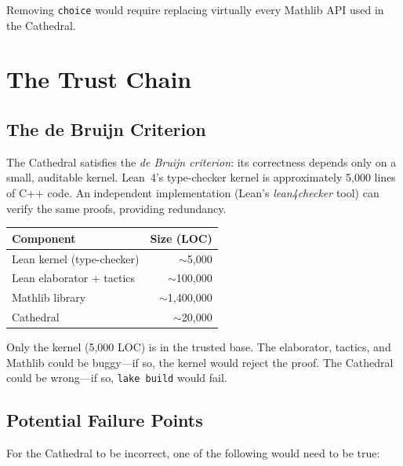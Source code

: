 \documentclass[11pt,a4paper]{article}
\theoremstyle{plain}
\theoremstyle{definition}
\newcommand{\lean}[1]{\texttt{#1}}
\begin{document}
Removing \lean{choice} would require replacing virtually every
Mathlib API used in the Cathedral.

\section{The Trust Chain}
\label{sec:trust}

\subsection{The de Bruijn Criterion}

The Cathedral satisfies the \emph{de Bruijn criterion}: its
correctness depends only on a small, auditable kernel. Lean~4's
type-checker kernel is approximately 5{,}000 lines of C++ code. An
independent implementation (Lean's \emph{lean4checker} tool) can
verify the same proofs, providing redundancy.

\begin{center}
\begin{tabular}{@{}lr@{}}
\toprule
\textbf{Component} & \textbf{Size (LOC)} \\
\midrule
Lean kernel (type-checker) & $\sim$5{,}000 \\
Lean elaborator + tactics & $\sim$100{,}000 \\
Mathlib library & $\sim$1{,}400{,}000 \\
Cathedral & $\sim$20{,}000 \\
\bottomrule
\end{tabular}
\end{center}

Only the kernel (5{,}000 LOC) is in the trusted base. The elaborator,
tactics, and Mathlib could be buggy---if so, the kernel would reject
the proof. The Cathedral could be wrong---if so, \lean{lake build}
would fail.

\subsection{Potential Failure Points}

For the Cathedral to be incorrect, one of the following would need
to be true:
\end{document}
